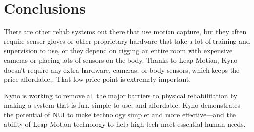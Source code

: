 \section*{Conclusions}

There are other rehab systems out there that use motion capture, but they often require sensor gloves or other proprietary hardware that take a lot of training and supervision to use, or they depend on rigging an entire room with expensive cameras or placing lots of sensors on the body. Thanks to Leap Motion, Kyno doesn’t require any extra hardware, cameras, or body sensors, which keeps the price affordable,. That low price point is extremely important.

Kyno is working to remove all the major barriers to physical rehabilitation by making a system that is fun, simple to use, and affordable. Kyno demonstrates the potential of NUI to make technology simpler and more effective—and the ability of Leap Motion technology to help high tech meet essential human needs.




\clearpage